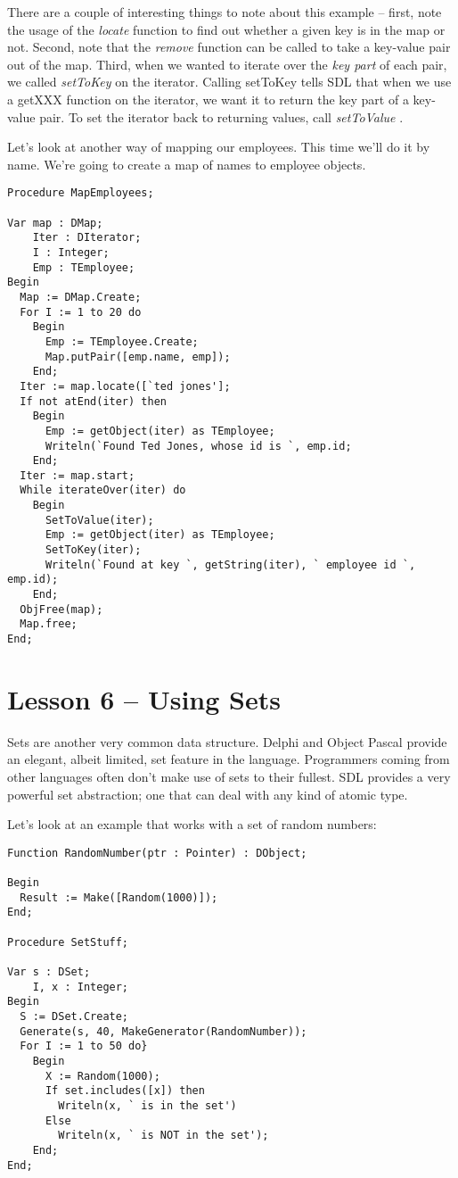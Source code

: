 \documentclass{report}
\begin{document}
There are a couple of interesting things to note about this example --
first, note the usage of the \emph{locate} function to find out whether a
given key is in the map or not. Second, note that the \emph{remove} function
can be called to take a key-value pair out of the map. Third, when we wanted
to iterate over the \emph{key part} of each pair, we called \emph{setToKey}
on the iterator. Calling setToKey tells SDL that when we use a getXXX
function on the iterator, we want it to return the key part of a key-value
pair. To set the iterator back to returning values, call \emph{setToValue} .

Let's look at another way of mapping our employees. This 
time we'll do it by name. We're going to create a map of names to employee objects.

\begin{lstlisting}
Procedure MapEmployees;

Var map : DMap;
    Iter : DIterator;
    I : Integer;
    Emp : TEmployee;
Begin
  Map := DMap.Create;
  For I := 1 to 20 do
    Begin
      Emp := TEmployee.Create;
      Map.putPair([emp.name, emp]);
    End;
  Iter := map.locate([`ted jones'];
  If not atEnd(iter) then
    Begin
      Emp := getObject(iter) as TEmployee;
      Writeln(`Found Ted Jones, whose id is `, emp.id;
    End;
  Iter := map.start;
  While iterateOver(iter) do
    Begin
      SetToValue(iter);
      Emp := getObject(iter) as TEmployee;
      SetToKey(iter);
      Writeln(`Found at key `, getString(iter), ` employee id `, emp.id);
    End;
  ObjFree(map);
  Map.free;
End;
\end{lstlisting}

\section{Lesson 6 -- Using Sets}

Sets are another very common data structure. Delphi and Object Pascal
provide an elegant, albeit limited, set feature in the language. Programmers
coming from other languages often don't make use of sets to their fullest.
SDL provides a very powerful set abstraction; one that can deal with any
kind of atomic type.

Let's look at an example that works with a set of random numbers:

\begin{lstlisting}
Function RandomNumber(ptr : Pointer) : DObject;

Begin
  Result := Make([Random(1000)]);
End;

Procedure SetStuff;

Var s : DSet;
    I, x : Integer;
Begin
  S := DSet.Create;
  Generate(s, 40, MakeGenerator(RandomNumber));
  For I := 1 to 50 do}
    Begin
      X := Random(1000);
      If set.includes([x]) then
        Writeln(x, ` is in the set')
      Else
        Writeln(x, ` is NOT in the set');
    End;
End;
\end{lstlisting}
\end{document}
